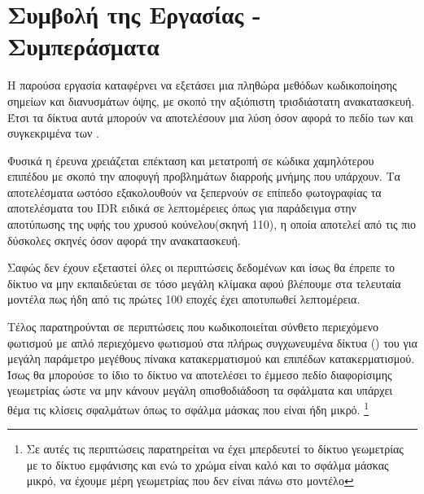 \section{Συμβολή της Εργασίας - Συμπεράσματα}
\label{contribution}

Η παρούσα εργασία καταφέρνει να εξετάσει μια πληθώρα μεθόδων κωδικοποίησης σημείων και διανυσμάτων όψης, με σκοπό την αξιόπιστη τρισδιάστατη ανακατασκευή. Έτσι τα δίκτυα αυτά μπορούν να αποτελέσουν μια λύση όσον αφορά το πεδίο των  και συγκεκριμένα των . 

Φυσικά η έρευνα χρειάζεται επέκταση και μετατροπή σε κώδικα χαμηλότερου επιπέδου με σκοπό την αποφυγή προβλημάτων διαρροής μνήμης που υπάρχουν. Τα αποτελέσματα ωστόσο εξακολουθούν να ξεπερνούν σε επίπεδο φωτογραφίας τα αποτελέσματα του IDR ειδικά σε λεπτομέρειες όπως για παράδειγμα στην αποτύπωσης της υφής του χρυσού κούνελου(σκηνή 110), η οποία αποτελεί από τις πιο δύσκολες σκηνές όσον αφορά την  ανακατασκευή.

Σαφώς δεν έχουν εξεταστεί όλες οι περιπτώσεις δεδομένων και ίσως θα έπρεπε το δίκτυο να μην εκπαιδεύεται σε τόσο μεγάλη κλίμακα αφού βλέπουμε στα τελευταία μοντέλα  πως ήδη από τις πρώτες 100 εποχές έχει αποτυπωθεί λεπτομέρεια.

Τέλος παρατηρούνται  σε περιπτώσεις που κωδικοποιείται σύνθετο περιεχόμενο φωτισμού με απλό περιεχόμενο φωτισμού στα πλήρως συγχωνευμένα δίκτυα () του  για μεγάλη παράμετρο μεγέθους πίνακα κατακερματισμού και επιπέδων κατακερματισμού. Ίσως θα μπορούσε το ίδιο το δίκτυο  να αποτελέσει το έμμεσο πεδίο διαφορίσιμης γεωμετρίας ώστε να μην κάνουν μεγάλη οπισθοδιάδοση τα σφάλματα και υπάρχει θέμα τις κλίσεις σφαλμάτων όπως το σφάλμα μάσκας που είναι ήδη μικρό. \footnote{Σε αυτές τις περιπτώσεις παρατηρείται να έχει μπερδευτεί το δίκτυο γεωμετρίας με το δίκτυο εμφάνισης και ενώ το χρώμα είναι καλό και το σφάλμα μάσκας μικρό, να έχουμε μέρη γεωμετρίας που δεν είναι πάνω στο μοντέλο}